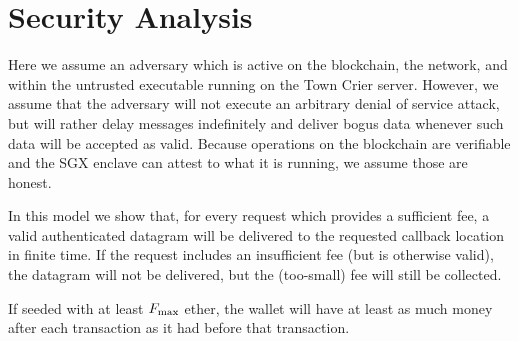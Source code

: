 \section{Security Analysis}

Here we assume an adversary which is active on the blockchain, the network, and within the untrusted executable running on the Town Crier server.
However, we assume that the adversary will not execute an arbitrary denial of service attack, but will rather delay messages indefinitely and deliver bogus data whenever such data will be accepted as valid.
Because operations on the blockchain are verifiable and the SGX enclave can attest to what it is running, we assume those are honest.

In this model we show that, for every request which provides a sufficient fee,
a valid authenticated datagram will be delivered to the requested callback location in finite time.
If the request includes an insufficient fee (but is otherwise valid),
the datagram will not be delivered, but the (too-small) fee will still be collected.

\begin{lemma} \label{lem:non-bankrupt-p_sgx}
If seeded with at least $F_{\rm max}$ ether, the \sgxadd wallet will have
at least as much money after each transaction as it had before that transaction.
\end{lemma}

